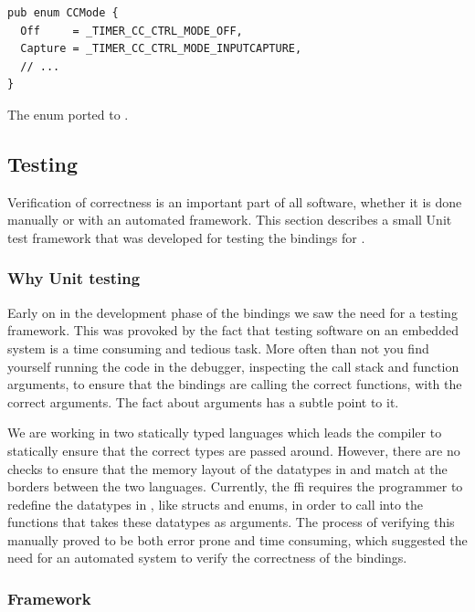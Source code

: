 \begin{listing}[h]
\begin{verbatim}
pub enum CCMode {
  Off     = _TIMER_CC_CTRL_MODE_OFF,
  Capture = _TIMER_CC_CTRL_MODE_INPUTCAPTURE,
  // ...
}
\end{verbatim}
\caption{The enum ported to {\rust}.}
\label{lst:enum_naming_rust}
\end{listing}

\subsection{Testing}
\label{ssub:testing}

Verification of correctness is an important part of all software, whether it is done manually or with an automated framework.
This section describes a small Unit test framework that was developed for testing the bindings for {\emlib}.

\subsubsection{Why Unit testing}

Early on in the development phase of the {\emlib} bindings we saw the need for a testing framework.
This was provoked by the fact that testing software on an embedded system is a time consuming and tedious task.
More often than not you find yourself running the code in the debugger, inspecting the call stack and function arguments, to ensure that the bindings are calling the correct functions, with the correct arguments.
The fact about arguments has a subtle point to it.

We are working in two statically typed languages which leads the compiler to statically ensure that the correct types are passed around.
However, there are no checks to ensure that the memory layout of the datatypes in {\C} and {\rust} match at the borders between the two languages.
Currently, the {\rust} \gls{ffi} requires the programmer to redefine the {\C} datatypes in {\rust}, like structs and enums, in order to call into the {\C} functions that takes these datatypes as arguments.
The process of verifying this manually proved to be both error prone and time consuming, which suggested the need for an automated system to verify the correctness of the bindings.

\subsubsection{Framework}

